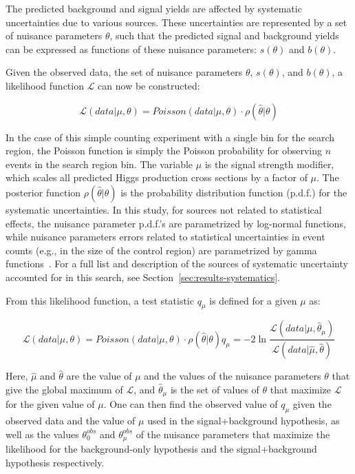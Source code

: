 The predicted background and signal yields are affected by systematic uncertainties due to various sources. These uncertainties are represented by a set of nuisance parameters $\theta$, such that the predicted signal and background yields can be expressed as functions of these nuisance parameters: $s(\theta)$ and $b(\theta)$.

Given the observed data, the set of nuisance parameters $\theta$, $s(\theta)$, and $b(\theta)$, a likelihood function $\mathcal{L}$ can now be constructed:

\begin{equation}
\mathcal{L}(data \vert \mu,\theta) = Poisson(data \vert \mu,\theta) \cdot \rho(\hat{\theta} \vert \theta)
\label{eq:likelihood}
\end{equation}

In the case of this simple counting experiment with a single bin for the search region, the Poisson function is simply the Poisson probability for observing $n$ events in the search region bin. The variable $\mu$ is the signal strength modifier, which scales all predicted Higgs production cross sections by a factor of $\mu$. The posterior function $\rho(\hat{\theta} \vert \theta)$ is the probability distribution function (p.d.f.) for the systematic uncertainties. In this study, for sources not related to statistical effects, the nuisance parameter p.d.f.'s are parametrized by log-normal functions, while nuisance parameters errors related to statistical uncertainties in event counts (e.g., in the size of the control region) are parametrized by gamma functions~\cite{CombinedTwiki}. For a full list and description of the sources of systematic uncertainty accounted for in this search, see Section~\ref{sec:results-systematics}.

From this likelihood function, a test statistic $q_{\mu}$ is defined for a given $\mu$ as:

\begin{equation}
\mathcal{L}(data \vert \mu,\theta) = Poisson(data \vert \mu,\theta) \cdot \rho(\hat{\theta} \vert \theta)
q_{\mu} = -2\ln\frac{\mathcal{L}(data \vert \mu,\hat{\theta}_{\mu})}{\mathcal{L}(data \vert \hat{\mu},\hat{\theta})}
\label{eq:test-statistic}
\end{equation}

Here, $\hat{\mu}$ and $\hat{\theta}$ are the value of $\mu$ and the values of the nuisance parameters $\theta$ that give the global maximum of $\mathcal{L}$, and $\hat{\theta}_{\mu}$ is the set of values of $\theta$ that maximize $\mathcal{L}$ for the given value of $\mu$. One can then find the observed value of $q_{\mu}$ given the observed data and the value of $\mu$ used in the signal+background hypothesis, as well as the values $\theta^{obs}_{0}$ and $\theta^{obs}_{\mu}$ of the nuisance parameters that maximize the likelihood for the background-only hypothesis and the signal+background hypothesis respectively.

